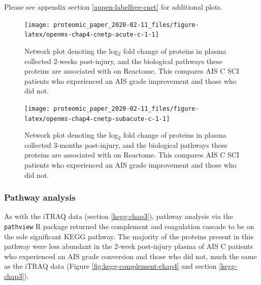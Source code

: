\documentclass[
]{article}
\begin{document}
Please see appendix section \ref{appen-labelfree-cnet} for additional plots.

\begin{SidewaysFigure}



\begin{figure}

{\centering \texttt{[image: proteomic\_paper\_2020-02-11\_files/figure-latex/openms-chap4-cnetp-acute-c-1-1]} 

}

\caption{Network plot denoting the log$_2$ fold change of proteins in plasma collected 2-weeks post-injury, and the biological pathways these proteins are associated with on Reactome. This compares AIS C SCI patients who experienced an AIS grade improvement and those who did not.}\label{fig:openms-chap4-cnetp-acute-c-1}
\end{figure}

\end{SidewaysFigure}
\begin{SidewaysFigure}



\begin{figure}

{\centering \texttt{[image: proteomic\_paper\_2020-02-11\_files/figure-latex/openms-chap4-cnetp-subacute-c-1-1]} 

}

\caption{Network plot denoting the log$_2$ fold change of proteins in plasma collected 3-months post-injury, and the biological pathways these proteins are associated with on Reactome. This compares AIS C SCI patients who experienced an AIS grade improvement and those who did not.}\label{fig:openms-chap4-cnetp-subacute-c-1}
\end{figure}

\end{SidewaysFigure}
\clearpage

\hypertarget{pathway-analysis}{%
\subsubsection{Pathway analysis}\label{pathway-analysis}}

As with the iTRAQ data (section \ref{kegg-chap3}), pathway analysis via the \texttt{pathview} R package returned the complement and coagulation cascade to be on the sole significant KEGG pathway.
The majority of the proteins present in this pathway were less abundant in the 2-week post-injury plasma of AIS C patients who experienced an AIS grade conversion and those who did not, much the same as the iTRAQ data (Figure \ref{fig:kegg-complement-chap4} and section \ref{kegg-chap3}).
\end{document}
